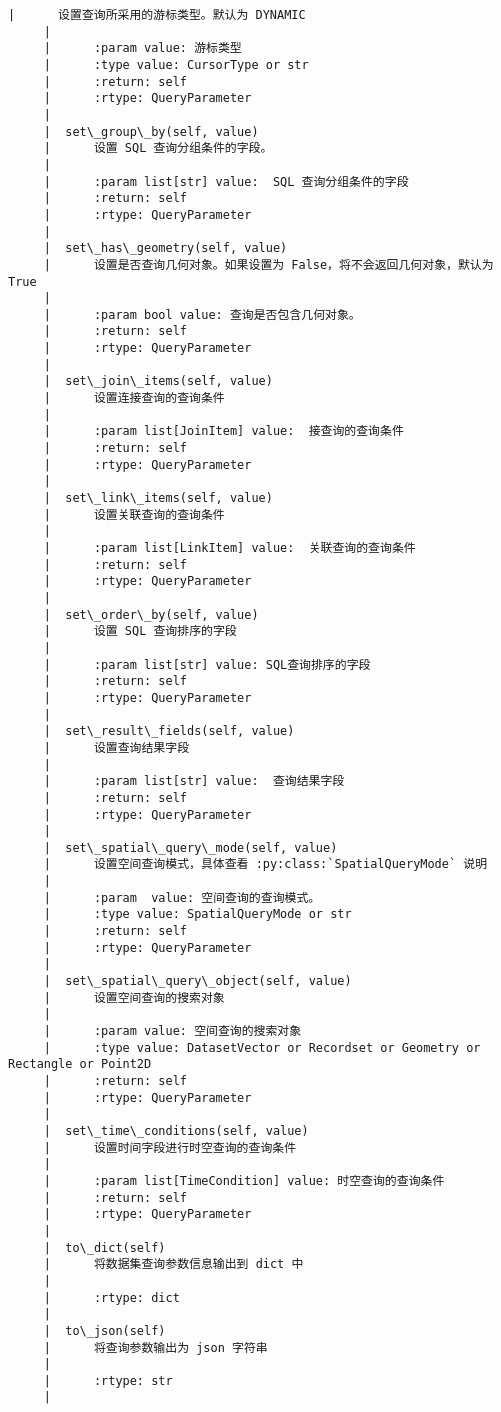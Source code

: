 \documentclass[11pt]{article}
\begin{document}
\begin{Verbatim}[commandchars=\\\{\}]
     |      设置查询所采用的游标类型。默认为 DYNAMIC
     |      
     |      :param value: 游标类型
     |      :type value: CursorType or str
     |      :return: self
     |      :rtype: QueryParameter
     |  
     |  set\_group\_by(self, value)
     |      设置 SQL 查询分组条件的字段。
     |      
     |      :param list[str] value:  SQL 查询分组条件的字段
     |      :return: self
     |      :rtype: QueryParameter
     |  
     |  set\_has\_geometry(self, value)
     |      设置是否查询几何对象。如果设置为 False，将不会返回几何对象，默认为 True
     |      
     |      :param bool value: 查询是否包含几何对象。
     |      :return: self
     |      :rtype: QueryParameter
     |  
     |  set\_join\_items(self, value)
     |      设置连接查询的查询条件
     |      
     |      :param list[JoinItem] value:  接查询的查询条件
     |      :return: self
     |      :rtype: QueryParameter
     |  
     |  set\_link\_items(self, value)
     |      设置关联查询的查询条件
     |      
     |      :param list[LinkItem] value:  关联查询的查询条件
     |      :return: self
     |      :rtype: QueryParameter
     |  
     |  set\_order\_by(self, value)
     |      设置 SQL 查询排序的字段
     |      
     |      :param list[str] value: SQL查询排序的字段
     |      :return: self
     |      :rtype: QueryParameter
     |  
     |  set\_result\_fields(self, value)
     |      设置查询结果字段
     |      
     |      :param list[str] value:  查询结果字段
     |      :return: self
     |      :rtype: QueryParameter
     |  
     |  set\_spatial\_query\_mode(self, value)
     |      设置空间查询模式，具体查看 :py:class:`SpatialQueryMode` 说明
     |      
     |      :param  value: 空间查询的查询模式。
     |      :type value: SpatialQueryMode or str
     |      :return: self
     |      :rtype: QueryParameter
     |  
     |  set\_spatial\_query\_object(self, value)
     |      设置空间查询的搜索对象
     |      
     |      :param value: 空间查询的搜索对象
     |      :type value: DatasetVector or Recordset or Geometry or Rectangle or Point2D
     |      :return: self
     |      :rtype: QueryParameter
     |  
     |  set\_time\_conditions(self, value)
     |      设置时间字段进行时空查询的查询条件
     |      
     |      :param list[TimeCondition] value: 时空查询的查询条件
     |      :return: self
     |      :rtype: QueryParameter
     |  
     |  to\_dict(self)
     |      将数据集查询参数信息输出到 dict 中
     |      
     |      :rtype: dict
     |  
     |  to\_json(self)
     |      将查询参数输出为 json 字符串
     |      
     |      :rtype: str
     |  

\end{Verbatim}
\end{document}
